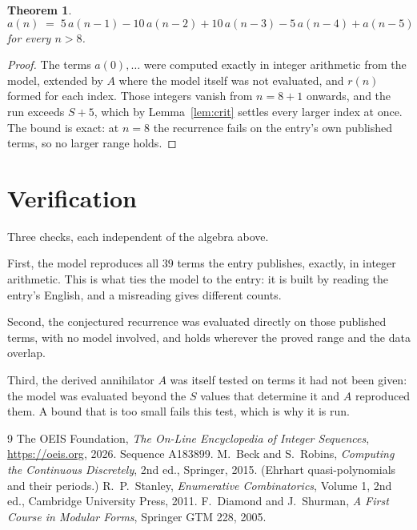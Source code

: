 \documentclass[11pt,a4paper]{article}
\theoremstyle{plain}
\newtheorem{theorem}{Theorem}
\theoremstyle{definition}
\begin{document}
\begin{theorem}
\[
a(n)\;=\;5\,a(n-1) - 10\,a(n-2) + 10\,a(n-3) - 5\,a(n-4) + a(n-5)
\]
for every $n>8$.
\end{theorem}

\begin{proof}
The terms $a(0),\dots$ were computed exactly in integer arithmetic from the model, extended by
$A$ where the model itself was not evaluated, and $r(n)$ formed for each index. Those integers
vanish from $n=8+1$ onwards, and the run exceeds $S+5$, which by
Lemma~\ref{lem:crit} settles every larger index at once. The bound is exact: at $n=8$ the recurrence fails on the entry's own published terms, so no larger range holds.
\end{proof}

\section{Verification}

Three checks, each independent of the algebra above.

First, the model reproduces all $39$ terms the entry publishes, exactly, in integer
arithmetic. This is what ties the model to the entry: it is built by reading the entry's
English, and a misreading gives different counts.

Second, the conjectured recurrence was evaluated directly on those published terms, with no
model involved, and holds wherever the proved range and the data overlap.

Third, the derived annihilator $A$ was itself tested on terms it had not been given: the model
was evaluated beyond the $S$ values that determine it and $A$ reproduced them. A bound that is
too small fails this test, which is why it is run.

\begin{thebibliography}{9}
 The OEIS Foundation, \emph{The On-Line Encyclopedia of Integer
Sequences}, \url{https://oeis.org}, 2026. Sequence A183899.
 M.~Beck and S.~Robins, \emph{Computing the Continuous Discretely},
2nd ed., Springer, 2015. (Ehrhart quasi-polynomials and their periods.)
 R.~P.~Stanley, \emph{Enumerative Combinatorics}, Volume 1, 2nd ed.,
Cambridge University Press, 2011.
 F.~Diamond and J.~Shurman, \emph{A First Course in Modular Forms},
Springer GTM 228, 2005.
\end{thebibliography}
\end{document}

